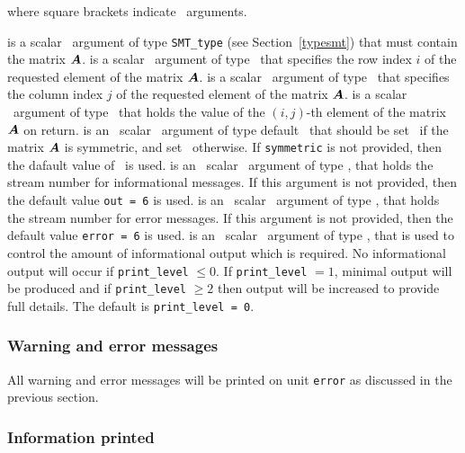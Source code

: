 \documentclass{galahad}
\begin{document}
\vspace*{1mm}
\noindent where square brackets indicate \optional\ arguments. 
\vspace*{0mm}
\begin{description}
   is a scalar \intentin\ argument of type {\tt SMT\_type} (see
     Section~\ref{typesmt}) that must contain the matrix ${\bm{A}}$.
   is a scalar \intentin\ argument of type \integer\ that
     specifies the row index $i$ of the requested element of the
     matrix ${\bm{A}}$.
   is a scalar \intentin\ argument of type \integer\ that
     specifies the column index $j$ of the requested element of the
     matrix ${\bm{A}}$.
   is a scalar \intentout\ argument of type \realdp\ that
     holds the value of the $(i,j)$-th element of the matrix ${\bm{A}}$ on return.
   is an \optional\ scalar \intentin\ argument of type default
     \logical\ that should be set \true\ if the matrix ${\bm{A}}$ is
     symmetric, and set \false\ otherwise.  If {\tt symmetric} is not
     provided, then the dafault value of \false\ is used. 
   is an \optional\ scalar \intentin\ argument of type \integer, that holds the
     stream number for informational messages. If this argument is not
     provided, then the default value {\tt out = 6} is used.
   is an \optional\ scalar \intentin\ argument of type \integer, that holds the
     stream number for error messages. If this argument is not
     provided, then the default value {\tt error = 6} is used.
   is an \optional\ scalar \intentin\ argument of type \integer, that is used
     to control the amount of informational output which is required. No 
     informational output will occur if {\tt print\_level} $\leq 0$. If 
     {\tt print\_level} $= 1$, minimal output will be produced and if
     {\tt print\_level} $\geq 2$ then output will be
     increased to provide full details.
     The default is {\tt print\_level = 0}.
\end{description}

\subsubsection{Warning and error messages}\label{getval-error}

All warning and error messages will be printed on unit {\tt error} as
discussed in the previous section.

\subsubsection{Information printed}\label{getval-info}
\end{document}
